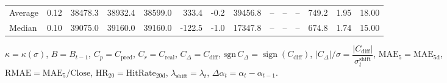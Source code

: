 \begin{threeparttable}
{\begin{tabular}{lrrrrrrrrrrrrr}
Average &     0.12 & 38478.3 & 38932.4 & 38599.0 &      333.4 &                     -0.2 &             39456.8 &         -- &        -- &             -- &            749.2 &            1.95 &                  18.00 \\
 Median &     0.10 & 39075.0 & 39160.0 & 39160.0 &     -122.5 &                     -1.0 &             17347.8 &         -- &        -- &             -- &            674.8 &            1.74 &                  15.00 \\
\bottomrule
\end{tabular}
}
\begin{tablenotes}\footnotesize
\item $\kappa=\kappa(\sigma)$, $B=B_{t-1}$, $C_p=C_{\text{pred}}$, $C_r=C_{\text{real}}$, $C_\Delta=C_{\text{diff}}$, $\mathrm{sgn}\,C_\Delta=\operatorname{sign}(C_{\text{diff}})$, $|C_\Delta|/\sigma=\dfrac{|C_{\text{diff}}|}{\sigma_t^{\text{shift}}}$, $\mathrm{MAE}_5=\mathrm{MAE}_{5\text{d}}$, $\mathrm{RMAE}= \mathrm{MAE}_5 / \text{Close}$, $\mathrm{HR}_{20}=\mathrm{HitRate}_{20\text{d}}$, 
$\lambda_{\text{shift}}=\lambda_t$, 
$\Delta\alpha_t=\alpha_t-\alpha_{t-1}$.
\end{tablenotes}
\end{threeparttable}
\endgroup
